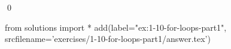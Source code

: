 
\begin{ex}
  \label{ex:1-10-for-loops-part1}
  
  \qed
\end{ex}
\begin{python0}
from solutions import *
add(label="ex:1-10-for-loops-part1",
    srcfilename='exercises/1-10-for-loops-part1/answer.tex')
\end{python0}

